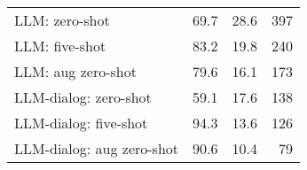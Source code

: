 \begin{table}[t]
\begin{tabular}{l r r r}
        LLM: zero-shot & 69.7 & 28.6 & 397 \\ 
        {\color{white}LLM: }five-shot & 83.2 & 19.8 & 240 \\
        {\color{white}LLM: }aug zero-shot & 79.6 & 16.1 & 173 \\
        LLM-dialog: zero-shot & 59.1 & 17.6 & 138 \\
        {\color{white}LLM-dialog: }five-shot & 94.3 & 13.6 & 126 \\
        {\color{white}LLM-dialog: }aug zero-shot & 90.6 & 10.4 & 79 \\
        \bottomrule
        \end{tabular}
\end{table}